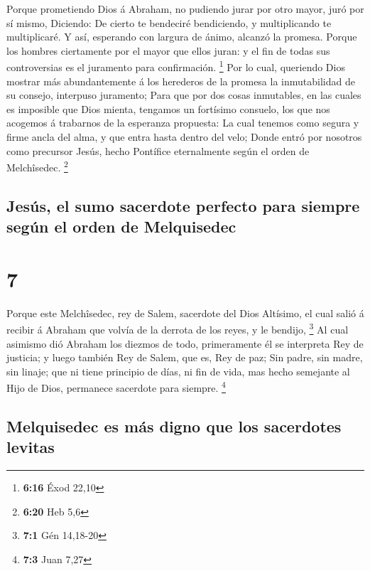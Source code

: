  Porque prometiendo Dios á Abraham, no pudiendo jurar por
otro mayor, juró por sí mismo,  Diciendo: De cierto te
bendeciré bendiciendo, y multiplicando te multiplicaré. 
Y así, esperando con largura de ánimo, alcanzó la promesa.
 Porque los hombres ciertamente por el mayor que ellos
juran: y el fin de todas sus controversias es el juramento para
confirmación. \footnote{\textbf{6:16} Éxod 22,10}  Por lo
cual, queriendo Dios mostrar más abundantemente á los herederos de la
promesa la inmutabilidad de su consejo, interpuso juramento;
 Para que por dos cosas inmutables, en las cuales es
imposible que Dios mienta, tengamos un fortísimo consuelo, los que nos
acogemos á trabarnos de la esperanza propuesta:  La cual
tenemos como segura y firme ancla del alma, y que entra hasta dentro del
velo;  Donde entró por nosotros como precursor Jesús,
hecho Pontífice eternalmente según el orden de Melchîsedec. \footnote{\textbf{6:20}
  Heb 5,6}

\hypertarget{jesuxfas-el-sumo-sacerdote-perfecto-para-siempre-seguxfan-el-orden-de-melquisedec}{%
\subsection{Jesús, el sumo sacerdote perfecto para siempre según el
orden de
Melquisedec}\label{jesuxfas-el-sumo-sacerdote-perfecto-para-siempre-seguxfan-el-orden-de-melquisedec}}

\hypertarget{section-6}{%
\section{7}\label{section-6}}

 Porque este Melchîsedec, rey de Salem, sacerdote del Dios
Altísimo, el cual salió á recibir á Abraham que volvía de la derrota de
los reyes, y le bendijo, \footnote{\textbf{7:1} Gén 14,18-20}
 Al cual asimismo dió Abraham los diezmos de todo,
primeramente él se interpreta Rey de justicia; y luego también Rey de
Salem, que es, Rey de paz;  Sin padre, sin madre, sin
linaje; que ni tiene principio de días, ni fin de vida, mas hecho
semejante al Hijo de Dios, permanece sacerdote para siempre. \footnote{\textbf{7:3}
  Juan 7,27}

\hypertarget{melquisedec-es-muxe1s-digno-que-los-sacerdotes-levitas}{%
\subsection{Melquisedec es más digno que los sacerdotes
levitas}\label{melquisedec-es-muxe1s-digno-que-los-sacerdotes-levitas}}

